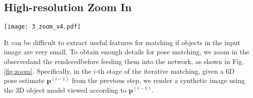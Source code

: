 \documentclass[twocolumn]{svjour3}
\newcommand{\dimnet}[0]{DeepIM}
\newcommand{\xreal}[0]{\mathbf{x}_{\text{obs}}}
\newcommand{\xrend}[0]{\mathbf{x}_{\text{rend}}}
\newcommand{\rend}[0]{rendered}
\newcommand{\real}[0]{observed}
\newcommand{\pose}[0]{\mathbf{p}}
\newcommand{\gtpose}[0]{\mathbf{\hat{p}}}
\begin{document}

\subsection{High-resolution Zoom In}

\label{sec:zoom}

\begin{figure*}[t] 
	\centering
	\texttt{[image: 3\_zoom\_v4.pdf]}
	\caption{{\dimnet\ operates on a zoomed in, up-sampled input image, the rendered image, and the two object masks ($480\times640$ in our case after zooming in).}}
	\label{fig:zoom}
\end{figure*}

It can be difficult to extract useful features for matching if objects in the input image are very small. 
To obtain enough details for pose matching, we zoom in the \real\image and the \rend\image before feeding them into the network, as shown in Fig. \ref{fig:zoom}. 
Specifically, in the $i$-th stage of the iterative matching, given a 6D pose estimate $\mathbf{p}^{(i-1)}$ from the previous step, we render a synthetic image using the 3D object model viewed according to $\mathbf{p}^{(i-1)}$. 
\end{document}

